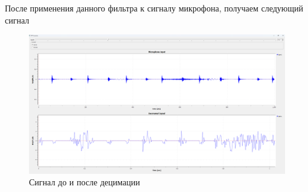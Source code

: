 \documentclass[12pt]{article}
\begin{document}
После применения данного фильтра к сигналу микрофона, получаем следующий сигнал

\begin{figure}[H]
    \centering
    \includegraphics[width=1\textwidth]{images/decim.png}
    \caption{Сигнал до и после децимации}
\end{figure}

\pagebreak
\end{document}
